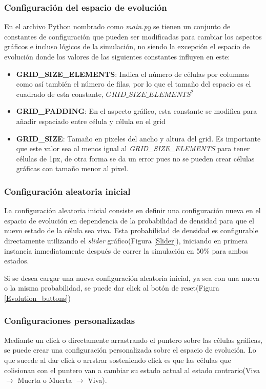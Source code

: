 \documentclass[]{article}
\begin{document}
		\subsubsection{Configuración del espacio de evolución}
			En el archivo Python nombrado como \textit{main.py} se tienen un conjunto de constantes de configuración que pueden ser modificadas para cambiar los aspectos gráficos e incluso lógicos de la simulación, no siendo la excepción el espacio de evolución donde los valores de las siguientes constantes influyen en este:
			\begin{itemize}
				\item \textbf{GRID\_SIZE\_ELEMENTS}: Indica el número de células por columnas como así también el número de filas, por lo que el tamaño del espacio es el cuadrado de esta constante, $GRID\_SIZE\_ELEMENTS^2$
				\item \textbf{GRID\_PADDING}: En el aspecto gráfico, esta constante se modifica para añadir espaciado entre célula y célula en el grid
				\item \textbf{GRID\_SIZE}: Tamaño en pixeles del ancho y altura del grid. Es importante que este valor sea al menos igual al \textit{GRID\_SIZE\_ELEMENTS} para tener células de 1px, de otra forma se da un error pues no se pueden crear células gráficas con tamaño menor al pixel.
			\end{itemize}
		
		\subsubsection{Configuración aleatoria inicial}
			La configuración aleatoria inicial consiste en definir una configuración nueva en el espacio de evolución en dependencia de la probabilidad de densidad para que el nuevo estado de la célula sea viva. Esta probabilidad de densidad es configurable directamente utilizando el \textit{slider} gráfico(Figura \ref{Slider}), iniciando en primera instancia inmediatamente después de correr la simulación en 50\% para ambos estados.
			
			Si se desea cargar una nueva configuración aleatoria inicial, ya sea con una nueva o la misma probabilidad, se puede dar click al botón de reset(Figura \ref{Evolution_buttons})
		
		\subsubsection{Configuraciones personalizadas}
			Mediante un click o directamente arrastrando el puntero sobre las células gráficas, se puede crear una configuración personalizada sobre el espacio de evolución. Lo que sucede al dar click o arrstrar sosteniendo click es que las células que colisionan con el puntero van a cambiar su estado actual al estado contrario(Viva $\rightarrow$ Muerta o Muerta $\rightarrow$ Viva).
			
\end{document}
